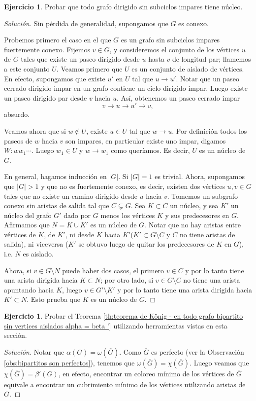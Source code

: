 \documentclass[12pt]{report}
\theoremstyle{plain}
\theoremstyle{definition}
\newtheorem{exercise}[theorem]{Ejercicio}
\newenvironment{solution}{\begin{proof}[Solución]}{\end{proof}}
\newcommand{\abs}[1]{\left \vert #1 \right \vert}
\renewcommand{\bar}[1]{\overline{#1}}
\begin{document}
\begin{exercise}
Probar que todo grafo dirigido sin subciclos impares tiene núcleo.
\end{exercise}
\begin{solution}
Sin pérdida de generalidad, supongamos que $G$ es conexo.

Probemos primero el caso en el que $G$ es un grafo sin subciclos impares fuertemente conexo. Fijemos $v \in G$, y consideremos el conjunto de los vértices $u$ de $G$ tales que existe un paseo dirigido desde $u$ hasta $v$ de longitud par; llamemos a este conjunto $U$. Veamos primero que $U$ es un conjunto de aislado de vértices. En efecto, supongamos que existe $u'$ en $U$ tal que $u \rightarrow u'$. Notar que un paseo cerrado dirigido impar en un grafo contiene un ciclo dirigido impar. Luego existe un paseo dirigido par desde $v$ hacia $u$. Así, obtenemos un paseo cerrado impar
\[
    v\to u \to u' \to v,
\]
absurdo.

Veamos ahora que si $w \not \in U$, existe $u \in U$ tal que $w \rightarrow u$. Por definición todos los paseos de $w$ hacia $v$ son impares, en particular existe uno impar, digamos $W: w w_1 \cdots $. Luego $w_1 \in U$ y $w \rightarrow w_1$ como queríamos. Es decir, $U$ es un núcleo de $G$.

En general, hagamos inducción en $\abs G$. Si $\abs G = 1$ es trivial. Ahora, supongamos que $\abs G > 1$ y que no es fuertemente conexo, es decir, existen dos vértices $u,v\in G$ tales que no existe un camino dirigido desde $u$ hacia $v$. Tomemos un subgrafo conexo sin aristas de salida tal que $C \subsetneq G$. Sea $K \subset C$ un núcleo, y sea $K'$ un núcleo del grafo $G'$ dado por $G$ menos los vértices $K$ y sus predecesores en $G$. Afirmamos que $N = K \cup K'$ es un núcleo de $G$. Notar que no hay aristas entre vértices de $K$, de $K'$, ni desde $K$ hacia $K'$($K' \subset G \setminus C$ y $C$ no tiene aristas de salida), ni viceversa ($K'$ se obtuvo luego de quitar los predecesores de $K$ en $G$), i.e. $N$ es aislado.

Ahora, si $v \in G \setminus N$ puede haber dos casos, el primero $v \in C$ y por lo tanto tiene una arista dirigida hacia $K \subset N$; por otro lado, si $v \in G \setminus C$ no tiene una arista apuntando hacia $K$, luego $v \in G' \setminus K'$ y por lo tanto tiene una arista dirigida hacia $K' \subset N$. Esto prueba que $K$ es un núcleo de $G$.
\end{solution}

\begin{exercise}
Probar el Teorema \ref{th:teorema de König - en todo grafo bipartito sin vertices aislados alpha = beta '} utilizando herramientas vistas en esta sección.
\end{exercise}
\begin{solution}
Notar que $\alpha (G) = \omega (\bar G)$. Como $\bar G$ es perfecto (ver la Observación \ref{obs:bipartitos son perfectos}), tenemos que $\omega (\bar G) = \chi (\bar G)$. Luego veamos que $\chi (\bar G) = \beta '(G)$, en efecto, encontrar un coloreo mínimo de los vértices de $\bar G$ equivale a encontrar un cubrimiento mínimo de los vértices utilizando aristas de $G$.
\end{solution}
\end{document}
